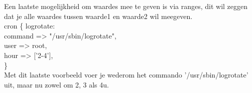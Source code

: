 	Een laatste mogelijkheid om waardes mee te geven is via ranges, dit wil zeggen dat je alle waardes tussen waarde1 en waarde2 wil meegeven.\\

	cron \{ logrotate:\\
		command => "/usr/sbin/logrotate",\\
		user => root,\\
		hour => ['2-4'],\\
	\}\\

	Met dit laatste voorbeeld voer je wederom het commando '/usr/sbin/logrotate' uit, maar nu zowel om 2, 3 als 4u.\\
